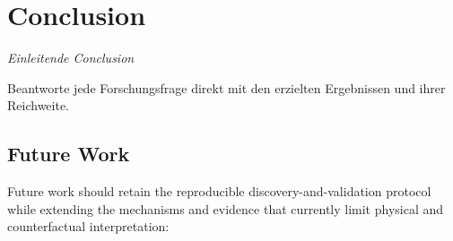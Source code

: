 \chapter{Conclusion}
\label{chp:conclusion}
\textit{Einleitende Conclusion}

\begin{sloppypar}
    Beantworte jede Forschungsfrage direkt mit den erzielten Ergebnissen und ihrer Reichweite.
\end{sloppypar}
\section{Future Work}
\label{sec:future_work}

Future work should retain the reproducible discovery-and-validation protocol
while extending the mechanisms and evidence that currently limit physical and
counterfactual interpretation:

